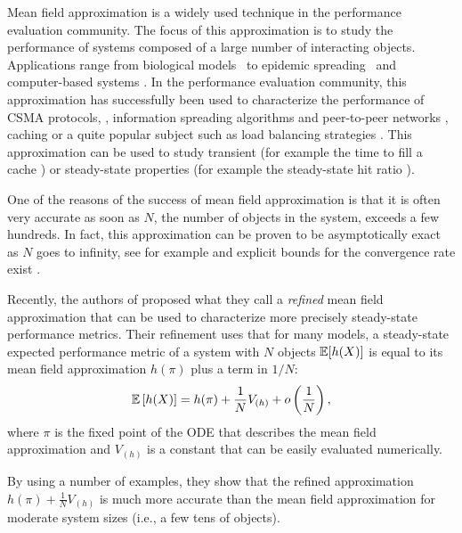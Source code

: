 \documentclass[sigconf]{acmart}
\newcommand\esp[1]{{\mathchoice{\besp{#1}}{\sesp{#1}}{\sesp{#1}}{\sesp{#1}}}}
\newcommand\besp[1]{\mathbb{E}\left[#1\right]}
\newcommand\sesp[1]{\mathbb{E}[#1]}
\newcommand\p[1]{\left(#1\right)}
\begin{document}
Mean field approximation is a widely used technique in the performance
evaluation community. The focus of this approximation is to study the
performance of systems composed of a large number of interacting
objects. Applications range from biological models~\cite{wilkinson2006} to epidemic spreading~\cite{andersson2000} and
computer-based systems \cite{benaim2008class}. In the performance
evaluation community, this approximation has successfully been used to
characterize the performance of CSMA protocols, \cite{cecchi2015mean},
information spreading algorithms and peer-to-peer networks
\cite{chaintreau2009age,massoulie1}, caching
\cite{chen2012projection,fagin1977asymptotic,gast2015transient} or a
quite popular subject such as load balancing strategies
\cite{gast2010mean,lu2011join,mitzenmacher1996power,tsitsiklis2011power,vvedenskaya1996queueing,minnebo2,xie1,mitzenmacher2016analyzing}. This
approximation can be used to study transient (for example the time to
fill a cache \cite{gast2015transient}) or steady-state properties (for
example the steady-state hit ratio
\cite{fagin1977asymptotic,chen2012projection}).

One of the reasons of the success of mean field approximation is that
it is often very accurate as soon as $N$, the number of objects in the
system, exceeds a few hundreds. In fact, this approximation can be
proven to be asymptotically exact as $N$ goes to infinity, see for
example \cite{kurtz70,kurtz1978strong,benaim2008class,gast2012markov}
and explicit bounds for the convergence rate exist
\cite{bortolussi2013bounds,gast2017expected,ying2016rate,ying2017stein}.

Recently, the authors of \cite{gast2017refined} proposed what they
call a \emph{refined} mean field approximation that can be used to
characterize more precisely steady-state performance metrics. Their
refinement uses that for many models, a steady-state expected
performance metric of a system with $N$ objects $\esp{h(X)}$ is equal
to its mean field approximation $h(\pi)$ plus a term in $1/N$:
\begin{align}
  \label{eq:refined_1/N}
  \esp{h(X)} = h(\pi) + \frac1NV_{(h)} + o\p{\frac1N},
\end{align}
where $\pi$ is the fixed point of the ODE that describes the
mean field approximation and $V_{(h)}$ is a constant that can be
easily evaluated numerically.

By using a number of examples, they show that the refined
approximation $h(\pi) + \frac1NV_{(h)}$ is much more accurate than the
mean field approximation for moderate system sizes (i.e., a few tens
of objects).
\end{document}

